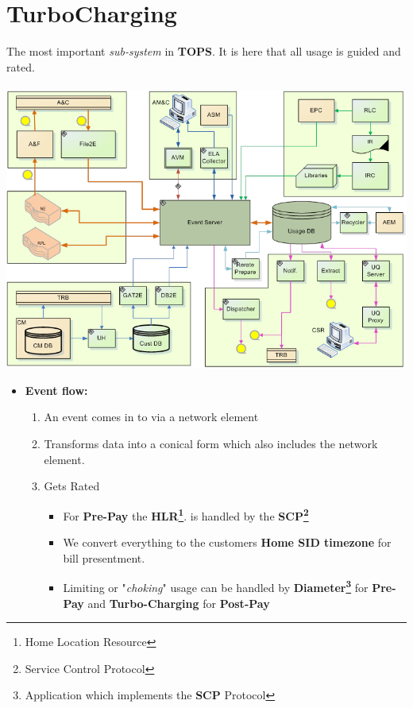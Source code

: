 \documentclass[12pt,twoside]{article}
\begin{document}
\section{TurboCharging}
\label{sec:orgheadline67}
   The most important \emph{sub-system} in \textbf{TOPS}. It is here that all usage is guided and rated.
\\
\\
\includegraphics[width=16cm]{Pictures/TC.png}
\begin{itemize}
\item \textbf{Event flow:}
\begin{enumerate}
\item An event comes in to via a network element
\item Transforms data into a conical form which also includes the
network element.
\item Gets Rated
\begin{itemize}
\item For \textbf{Pre-Pay} the \textbf{HLR\footnote{Home Location Resource}}. is handled by the \textbf{SCP\footnote{Service Control Protocol}}
\item We convert everything to the customers \textbf{Home SID timezone} for bill
presentment.
\item Limiting or "\emph{choking}" usage can be handled by \textbf{Diameter\footnote{Application which implements the \textbf{SCP} Protocol}} for
\textbf{Pre-Pay} and \textbf{Turbo-Charging} for \textbf{Post-Pay}
\end{itemize}
\end{enumerate}
\end{itemize}
\end{document}
